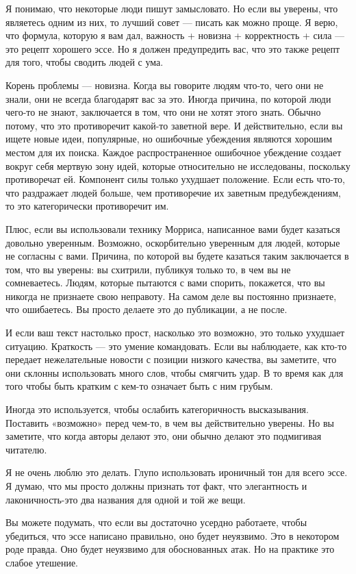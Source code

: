 \documentclass[ebook,12pt,oneside,openany]{memoir}
\begin{document}
Я понимаю, что некоторые люди пишут замысловато. Но если вы уверены,
что являетесь одним из них, то лучший совет — писать как можно проще.
Я верю, что формула, которую я вам дал, важность + новизна +
корректность + сила — это рецепт хорошего эссе. Но я должен
предупредить вас, что это также рецепт для того, чтобы сводить людей с
ума.

Корень проблемы — новизна. Когда вы говорите людям что-то, чего они не
знали, они не всегда благодарят вас за это. Иногда причина, по которой
люди чего-то не знают, заключается в том, что они не хотят этого
знать. Обычно потому, что это противоречит какой-то заветной вере. И
действительно, если вы ищете новые идеи, популярные, но ошибочные
убеждения являются хорошим местом для их поиска. Каждое
распространенное ошибочное убеждение создает вокруг себя мертвую зону
идей, которые относительно не исследованы, поскольку противоречат ей.
Компонент силы только ухудшает положение. Если есть что-то, что
раздражает людей больше, чем противоречие их заветным предубеждениям,
то это категорически противоречит им.

Плюс, если вы использовали технику Морриса, написанное вами будет
казаться довольно уверенным. Возможно, оскорбительно уверенным для
людей, которые не согласны с вами. Причина, по которой вы будете
казаться таким заключается в том, что вы уверены: вы схитрили,
публикуя только то, в чем вы не сомневаетесь. Людям, которые пытаются
с вами спорить, покажется, что вы никогда не признаете свою неправоту.
На самом деле вы постоянно признаете, что ошибаетесь. Вы просто
делаете это до публикации, а не после.

И если ваш текст настолько прост, насколько это возможно, это только
ухудшает ситуацию. Краткость — это умение командовать. Если вы
наблюдаете, как кто-то передает нежелательные новости с позиции
низкого качества, вы заметите, что они склонны использовать много
слов, чтобы смягчить удар. В то время как для того чтобы быть кратким
с кем-то означает быть с ним грубым.

Иногда это используется, чтобы ослабить категоричность высказывания.
Поставить «возможно» перед чем-то, в чем вы действительно уверены. Но
вы заметите, что когда авторы делают это, они обычно делают это
подмигивая читателю.

Я не очень люблю это делать. Глупо использовать ироничный тон для
всего эссе. Я думаю, что мы просто должны признать тот факт, что
элегантность и лаконичность-это два названия для одной и той же вещи.

Вы можете подумать, что если вы достаточно усердно работаете, чтобы
убедиться, что эссе написано правильно, оно будет неуязвимо. Это в
некотором роде правда. Оно будет неуязвимо для обоснованных атак. Но
на практике это слабое утешение.
\end{document}
